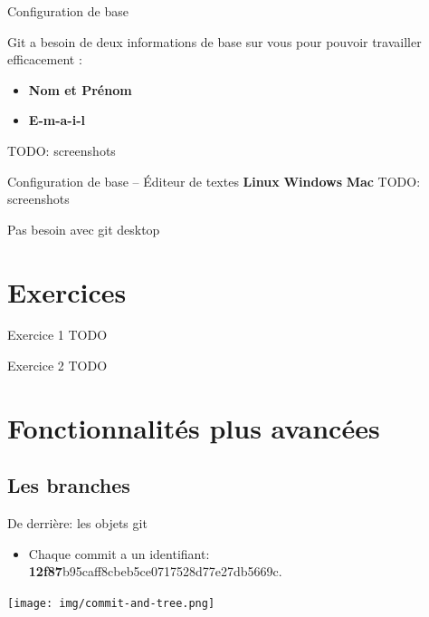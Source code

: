\documentclass{beamer}
\begin{document}
\begin{frame}{Configuration de base}

Git a besoin de deux informations de base sur vous pour pouvoir travailler
efficacement :

\begin{itemize}
\item \textbf{Nom et Prénom}
\item \textbf{E-m-a-i-l}
\end{itemize}
TODO: screenshots

\end{frame}

\begin{frame}{Configuration de base -- Éditeur de textes}
    \textbf{Linux}
    \textbf{Windows}
    \textbf{Mac}
    TODO: screenshots
    
    Pas besoin avec git desktop
\end{frame}


\section{Exercices}

\begin{frame}{Exercice 1}
    TODO
\end{frame}

\begin{frame}{Exercice 2}
    TODO
\end{frame}


\section{Fonctionnalités plus avancées}

\subsection{Les branches}

\begin{frame}{De derrière: les objets git}
    \begin{itemize}
        \item Chaque commit a un identifiant: \textbf{12f87}b95caff8cbeb5ce0717528d77e27db5669c.
    \end{itemize}
    \begin{center}
    \texttt{[image: img/commit-and-tree.png]}
    \end{center}
\end{frame}
\end{document}
